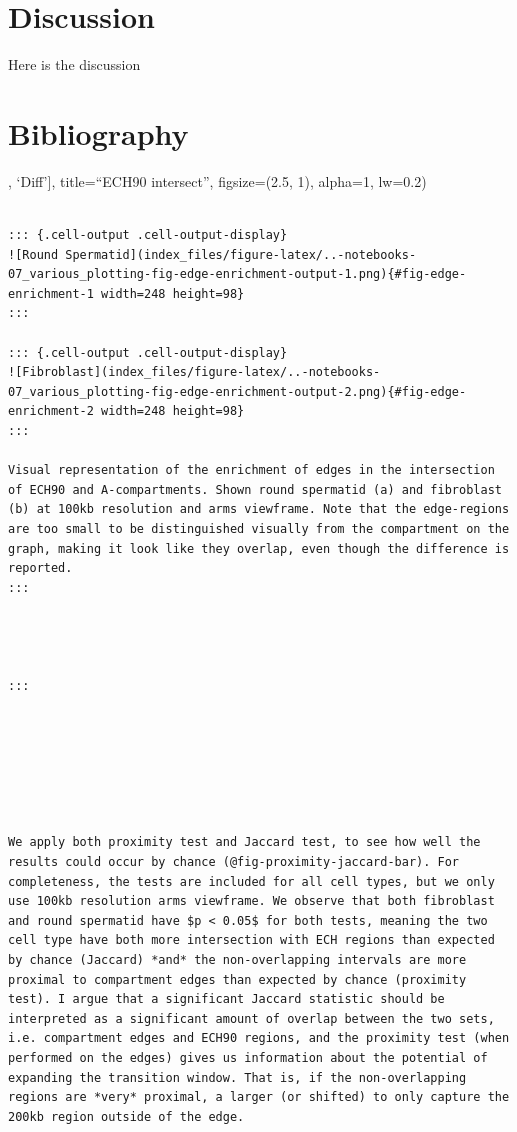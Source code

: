\documentclass[
  11pt,
  a4paper,
]{scrbook}
\begin{document}
\chapter{Discussion}\label{discussion-1}

Here is the discussion

\chapter*{Bibliography}\label{bibliography-1}

\begingroup
\raggedright


\endgroup

, `Diff'{]}, title=``ECH90 intersect'', figsize=(2.5, 1), alpha=1,
lw=0.2)

\begin{verbatim}

::: {.cell-output .cell-output-display}
![Round Spermatid](index_files/figure-latex/..-notebooks-07_various_plotting-fig-edge-enrichment-output-1.png){#fig-edge-enrichment-1 width=248 height=98}
:::

::: {.cell-output .cell-output-display}
![Fibroblast](index_files/figure-latex/..-notebooks-07_various_plotting-fig-edge-enrichment-output-2.png){#fig-edge-enrichment-2 width=248 height=98}
:::

Visual representation of the enrichment of edges in the intersection of ECH90 and A-compartments. Shown round spermatid (a) and fibroblast (b) at 100kb resolution and arms viewframe. Note that the edge-regions are too small to be distinguished visually from the compartment on the graph, making it look like they overlap, even though the difference is reported.
:::




:::







We apply both proximity test and Jaccard test, to see how well the results could occur by chance (@fig-proximity-jaccard-bar). For completeness, the tests are included for all cell types, but we only use 100kb resolution arms viewframe. We observe that both fibroblast and round spermatid have $p < 0.05$ for both tests, meaning the two cell type have both more intersection with ECH regions than expected by chance (Jaccard) *and* the non-overlapping intervals are more proximal to compartment edges than expected by chance (proximity test). I argue that a significant Jaccard statistic should be interpreted as a significant amount of overlap between the two sets, i.e. compartment edges and ECH90 regions, and the proximity test (when performed on the edges) gives us information about the potential of expanding the transition window. That is, if the non-overlapping regions are *very* proximal, a larger (or shifted) to only capture the 200kb region outside of the edge. 






\end{verbatim}
\end{document}
